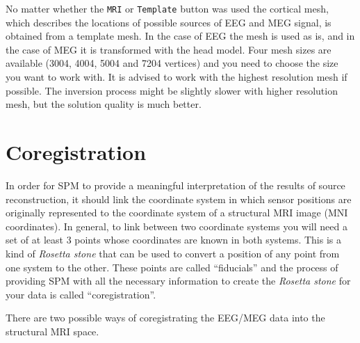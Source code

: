 No matter whether the \texttt{MRI} or \texttt{Template} button was used the cortical mesh, which describes the locations of possible sources of EEG and MEG signal, is obtained from a template mesh. In the case of EEG the mesh is used as is, and in the case of MEG it is transformed with the head model. Four mesh sizes are available (3004, 4004, 5004 and 7204 vertices) and you need to choose the size you want to work with. It is advised to work with the highest resolution mesh if possible. The inversion process might be slightly slower with higher resolution mesh, but the solution quality is much better.

\section{Coregistration}

In order for SPM to provide a meaningful interpretation of the results of source reconstruction, it should link the coordinate system in which sensor positions are originally represented to the coordinate system of a structural MRI image (MNI coordinates). In general, to link between two coordinate systems you will need a set of at least 3 points whose coordinates are known in both systems. This is a kind of \textit{Rosetta stone} that can be used to convert a position of any point from one system to the other. These points are called ``fiducials'' and the process of providing SPM with all the necessary information to create the \textit{Rosetta stone} for your data is called ``coregistration''.

There are two possible ways of coregistrating the EEG/MEG data into the structural MRI space.

